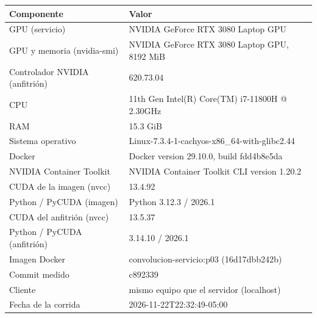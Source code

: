 \begin{tabular}{lp{9cm}}
\toprule
Componente & Valor \\
\midrule
GPU (servicio) & NVIDIA GeForce RTX 3080 Laptop GPU \\
GPU y memoria (nvidia-smi) & NVIDIA GeForce RTX 3080 Laptop GPU, 8192 MiB \\
Controlador NVIDIA (anfitrión) & 620.73.04 \\
CPU & 11th Gen Intel(R) Core(TM) i7-11800H @ 2.30GHz \\
RAM & 15.3 GiB \\
Sistema operativo & Linux-7.3.4-1-cachyos-x86\_64-with-glibc2.44 \\
Docker & Docker version 29.10.0, build fdd4b8e5da \\
NVIDIA Container Toolkit & NVIDIA Container Toolkit CLI version 1.20.2 \\
CUDA de la imagen (nvcc) & 13.4.92 \\
Python / PyCUDA (imagen) & Python 3.12.3 / 2026.1 \\
CUDA del anfitrión (nvcc) & 13.5.37 \\
Python / PyCUDA (anfitrión) & 3.14.10 / 2026.1 \\
Imagen Docker & convolucion-servicio:p03 (16d17dbb242b) \\
Commit medido & c892339 \\
Cliente & mismo equipo que el servidor (localhost) \\
Fecha de la corrida & 2026-11-22T22:32:49-05:00 \\
\bottomrule
\end{tabular}
